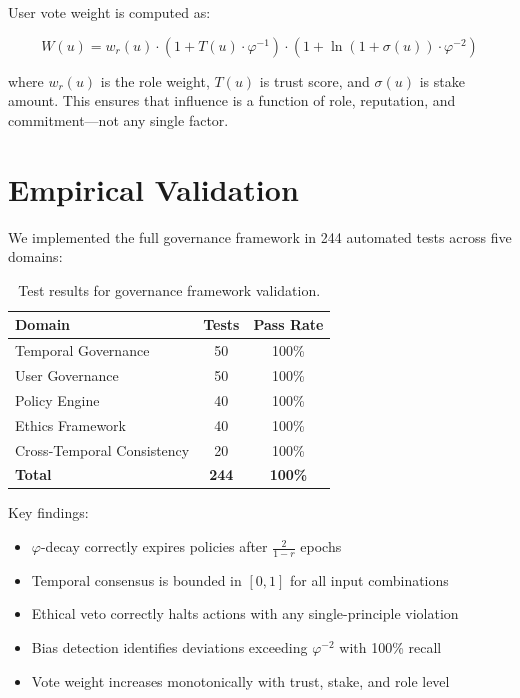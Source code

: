 \documentclass[11pt,twocolumn]{article}
\begin{document}
User vote weight is computed as:

\begin{equation}
W(u) = w_r(u) \cdot (1 + T(u) \cdot \varphi^{-1}) \cdot (1 + \ln(1 + \sigma(u)) \cdot \varphi^{-2})
\end{equation}

where $w_r(u)$ is the role weight, $T(u)$ is trust score, and $\sigma(u)$ is
stake amount. This ensures that influence is a function of role, reputation,
and commitment---not any single factor.

\section{Empirical Validation}

We implemented the full governance framework in 244 automated tests across
five domains:

\begin{table}[h]
\centering
\begin{tabular}{lcc}
\toprule
\textbf{Domain} & \textbf{Tests} & \textbf{Pass Rate} \\
\midrule
Temporal Governance & 50 & 100\% \\
User Governance & 50 & 100\% \\
Policy Engine & 40 & 100\% \\
Ethics Framework & 40 & 100\% \\
Cross-Temporal Consistency & 20 & 100\% \\
\midrule
\textbf{Total} & \textbf{244} & \textbf{100\%} \\
\bottomrule
\end{tabular}
\caption{Test results for governance framework validation.}
\end{table}

Key findings:
\begin{itemize}
\item $\varphi$-decay correctly expires policies after $\frac{2}{1-r}$ epochs
\item Temporal consensus is bounded in $[0, 1]$ for all input combinations
\item Ethical veto correctly halts actions with any single-principle violation
\item Bias detection identifies deviations exceeding $\varphi^{-2}$ with 100\% recall
\item Vote weight increases monotonically with trust, stake, and role level
\end{itemize}
\end{document}
